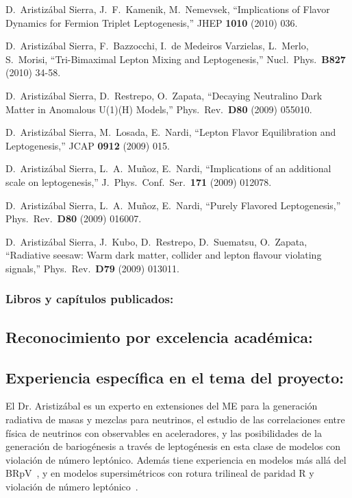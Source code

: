   D.~Aristizábal Sierra, J.~F.~Kamenik, M.~Nemevsek,
  ``Implications of Flavor Dynamics for Fermion Triplet Leptogenesis,''
  JHEP {\bf 1010 } (2010)  036.

  D.~Aristizábal Sierra, F.~Bazzocchi, I.~de Medeiros Varzielas, L.~Merlo, S.~Morisi,
  ``Tri-Bimaximal Lepton Mixing and Leptogenesis,''
  Nucl.\ Phys.\  {\bf B827 } (2010)  34-58.

  D.~Aristizábal Sierra, D.~Restrepo, O.~Zapata,
  ``Decaying Neutralino Dark Matter in Anomalous U(1)(H) Models,''
  Phys.\ Rev.\  {\bf D80 } (2009)  055010.

  D.~Aristizábal Sierra, M.~Losada, E.~Nardi,
  ``Lepton Flavor Equilibration and Leptogenesis,''
  JCAP {\bf 0912 } (2009)  015.

  D.~Aristizábal Sierra, L.~A.~Muñoz, E.~Nardi,
  ``Implications of an additional scale on leptogenesis,''
  J.\ Phys.\ Conf.\ Ser.\  {\bf 171 } (2009)  012078.

  D.~Aristizábal Sierra, L.~A.~Muñoz, E.~Nardi,
  ``Purely Flavored Leptogenesis,''
  Phys.\ Rev.\  {\bf D80 } (2009)  016007.

  D.~Aristizábal Sierra, J.~Kubo, D.~Restrepo, D.~Suematsu, O.~Zapata,
  ``Radiative seesaw: Warm dark matter, collider and lepton flavour violating signals,''
  Phys.\ Rev.\  {\bf D79 } (2009)  013011.
\subsubsection{Libros y capítulos publicados:}
\subsection{Reconocimiento por excelencia académica:}
\subsection{Experiencia específica en el tema del proyecto:}
El Dr. Aristizábal es un experto en extensiones del ME para la
generación radiativa de masas y mezclas para neutrinos, el estudio de
las correlaciones entre física de neutrinos con observables en
aceleradores\cite{AristizabalSierra:2006ri,AristizabalSierra:2006gb,AristizabalSierra:2007nf,Sierra:2008wj},
y las posibilidades de la generación de bariogénesis a través de
leptogénesis en esta clase de modelos con violación de número
leptónico\cite{AristizabalSierra:2010mv,AristizabalSierra:2009bh,AristizabalSierra:2009mq,Sierra:2009bm,AristizabalSierra:2007ur}. Además
tiene experiencia en modelos más allá del
BRpV~\cite{AristizabalSierra:2003ix}, y en modelos supersimétricos con
rotura trilineal de paridad R y violación de número
leptónico~\cite{Sierra:2009zq,AristizabalSierra:2008ye,Aristizabal
  Sierra:2004cy}.

